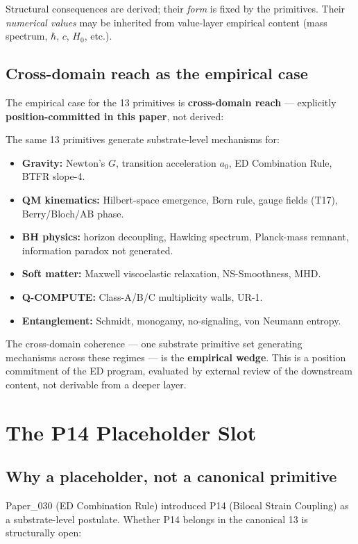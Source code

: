 \documentclass[11pt,a4paper]{article}
\begin{document}
Structural consequences are derived; their \emph{form} is fixed by the primitives. Their \emph{numerical values} may be inherited from value-layer empirical content (mass spectrum, $\hbar$, $c$, $H_0$, etc.).

\subsection{Cross-domain reach as the empirical case}

The empirical case for the 13 primitives is \textbf{cross-domain reach} --- explicitly \textbf{position-committed in this paper}, not derived:

The same 13 primitives generate substrate-level mechanisms for:

\begin{itemize}[noitemsep]
\item \textbf{Gravity:} Newton's $G$, transition acceleration $a_0$, ED Combination Rule, BTFR slope-4.
\item \textbf{QM kinematics:} Hilbert-space emergence, Born rule, gauge fields (T17), Berry/Bloch/AB phase.
\item \textbf{BH physics:} horizon decoupling, Hawking spectrum, Planck-mass remnant, information paradox not generated.
\item \textbf{Soft matter:} Maxwell viscoelastic relaxation, NS-Smoothness, MHD.
\item \textbf{Q-COMPUTE:} Class-A/B/C multiplicity walls, UR-1.
\item \textbf{Entanglement:} Schmidt, monogamy, no-signaling, von Neumann entropy.
\end{itemize}

The cross-domain coherence --- one substrate primitive set generating mechanisms across these regimes --- is the \textbf{empirical wedge}. This is a position commitment of the ED program, evaluated by external review of the downstream content, not derivable from a deeper layer.

\section{The P14 Placeholder Slot}

\subsection{Why a placeholder, not a canonical primitive}

Paper\_030 (ED Combination Rule) introduced P14 (Bilocal Strain Coupling) as a substrate-level postulate. Whether P14 belongs in the canonical 13 is structurally open:
\end{document}
